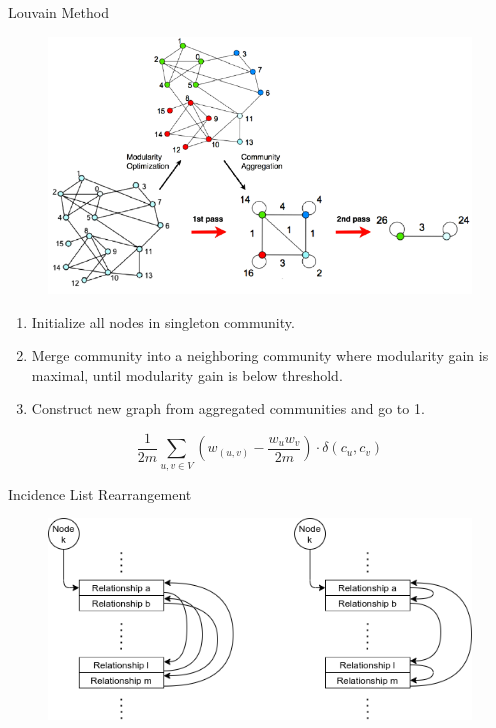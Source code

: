 \documentclass[rgb]{beamer}
\begin{document}
        \begin{frame}[allowframebreaks]{Louvain Method}
            \begin{figure}
                \begin{center}
                \includegraphics[keepaspectratio, height=0.8\textheight, width=.8\textwidth]{img/louvain.png}
                \end{center}
            \end{figure}
            
            \framebreak
            
            \begin{enumerate}
             \item Initialize all nodes in singleton community.
             \item Merge community into a neighboring community where modularity gain is maximal, until modularity gain is below threshold.
             \item Construct new graph from aggregated communities and go to 1.
            \end{enumerate}
            \vspace{2em}
            \[ \frac{1}{2m} \sum_{u,v \in V} \left( w_{(u, v)} - \frac{w_u w_v}{2m} \right) \cdot \delta (c_u, c_v) \]
            
        \end{frame}
        
        \begin{frame}{Incidence List Rearrangement}
            \begin{figure}
                \begin{center}
                    \includegraphics[keepaspectratio, height=0.65\textheight, width=.65\textwidth]{img/incl.png}
                \end{center}
            \end{figure}
        \end{frame}
        
\end{document}
